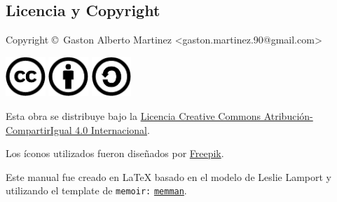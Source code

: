 \documentclass[10pt,letterpaper,extrafontsizes]{memoir}
\begin{document}
\begin{adjustwidth}{0in}{0in}
\chapter{Licencia y Copyright}



{\noindent
Copyright \copyright\ Gaston Alberto Martinez <gaston.martinez.90@gmail.com> \\
}

\begin{center}
\noindent
\includegraphics[height=1.5cm]{graficos/cc/cc}
\hspace{0.5cm}
\includegraphics[height=1.5cm]{graficos/cc/by}
\hspace{0.5cm}
\includegraphics[height=1.5cm]{graficos/cc/sa}
\end{center}

Esta obra se distribuye bajo la
\href{http://creativecommons.org/licenses/by-sa/4.0/deed.es}{Licencia Creative
Commons Atribución-CompartirIgual 4.0 Internacional}.

Los íconos utilizados fueron diseñados por
\href{http://www.freepik.com/}{Freepik}.

Este manual fue creado en LaTeX  basado en el modelo de Leslie Lamport y utilizando el template de \texttt{memoir:} \href{http://texdoc.net/texmf-dist/doc/latex/memoir/memman.tex}{\texttt{memman}}. 

\end{adjustwidth}

\vfil
\end{document}

